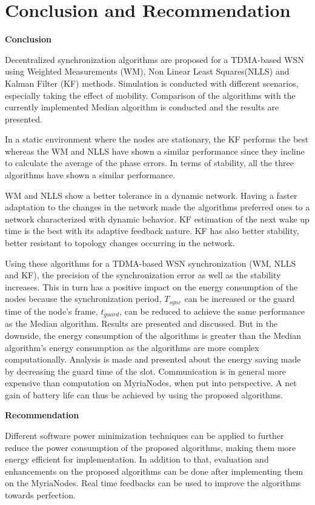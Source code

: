 \documentclass[journal]{IEEEtran}
\begin{document}
\section{\textbf{Conclusion and Recommendation}}\noindent
\textbf{Conclusion}\par
Decentralized synchronization algorithms are proposed for a TDMA-based WSN using Weighted Measurements (WM), Non Linear Least Squares(NLLS) and Kalman Filter (KF) methods. Simulation is conducted with different scenarios, especially taking the effect of mobility. Comparison of the algorithms with the currently implemented Median algorithm is conducted and the results are presented.
\par
In a static environment where the nodes are stationary, the KF performs the best whereas the WM and NLLS have shown a similar performance since they incline to calculate the average of the phase errors. In terms of stability, all the three algorithms have shown a similar performance.
\par
WM and NLLS show a better tolerance in a dynamic network. Having a
faster adaptation to the changes in the network made the algorithms
preferred ones to a network characterized with dynamic behavior. KF
estimation of the next wake up time is the best with its adaptive feedback nature. KF has also better stability, better
resistant to topology changes occurring in the network.
\par
Using these algorithms for a TDMA-based WSN synchronization (WM, NLLS and KF), the precision of the synchronization error as well as the stability increases. This in turn has a positive impact on the energy consumption of the nodes because the synchronization period, $T_{sync}$ can be increased or the guard time of the node's frame, $t_{guard}$, can be reduced to achieve the same performance as the Median algorithm. Results are presented and discussed. But in the downside, the energy consumption of the algorithms is greater than the Median algorithm's energy consumption as the algorithms are more complex computationally. Analysis is made and presented about the energy saving made by decreasing the guard time of the slot. Communication is in general more expensive than computation on MyriaNodes, when put into perspective. A net gain of battery life can thus be achieved by using the proposed algorithms.
\par \noindent \textbf{Recommendation} \par Different software power minimization techniques can be applied to further reduce the power consumption of the proposed algorithms, making them more energy efficient for implementation. In addition to that, evaluation and enhancements on the proposed algorithms can be done after implementing them on the MyriaNodes. Real time feedbacks can be used to improve the algorithms towards perfection.
\end{document}
